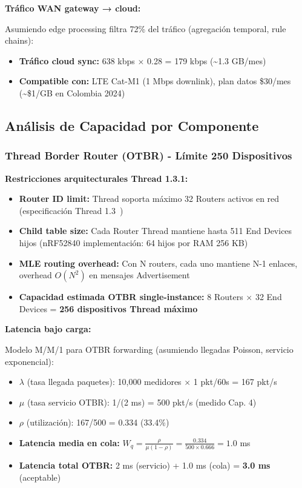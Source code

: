 \textbf{Tráfico WAN gateway → cloud:}

Asumiendo edge processing filtra 72\% del tráfico (agregación temporal, rule chains):
\begin{itemize}
\item \textbf{Tráfico cloud sync:} 638 kbps $\times$ 0.28 = 179 kbps (\textasciitilde{}1.3 GB/mes)
\item \textbf{Compatible con:} LTE Cat-M1 (1 Mbps downlink), plan datos \$30/mes (\textasciitilde\$1/GB en Colombia 2024)
\end{itemize}

\subsection{Análisis de Capacidad por Componente}

\subsubsection{Thread Border Router (OTBR) - Límite 250 Dispositivos}

\textbf{Restricciones arquitecturales Thread 1.3.1:}

\begin{itemize}
\item \textbf{Router ID limit:} Thread soporta máximo 32 Routers activos en red (especificación Thread 1.3~\cite{openthread2024})
\item \textbf{Child table size:} Cada Router Thread mantiene hasta 511 End Devices hijos (nRF52840 implementación: 64 hijos por RAM 256 KB)
\item \textbf{MLE routing overhead:} Con N routers, cada uno mantiene N-1 enlaces, overhead $O(N^2)$ en mensajes Advertisement
\item \textbf{Capacidad estimada OTBR single-instance:} 8 Routers $\times$ 32 End Devices = \textbf{256 dispositivos Thread máximo}
\end{itemize}

\textbf{Latencia bajo carga:}

Modelo M/M/1 para OTBR forwarding (asumiendo llegadas Poisson, servicio exponencial):
\begin{itemize}
\item $\lambda$ (tasa llegada paquetes): 10,000 medidores $\times$ 1 pkt/60s = 167 pkt/s
\item $\mu$ (tasa servicio OTBR): 1/(2 ms) = 500 pkt/s (medido Cap. 4)
\item $\rho$ (utilización): 167/500 = 0.334 (33.4\%)
\item \textbf{Latencia media en cola:} $W_q = \frac{\rho}{\mu(1-\rho)} = \frac{0.334}{500 \times 0.666} = 1.0$ ms
\item \textbf{Latencia total OTBR:} 2 ms (servicio) + 1.0 ms (cola) = \textbf{3.0 ms} (aceptable)
\end{itemize}


